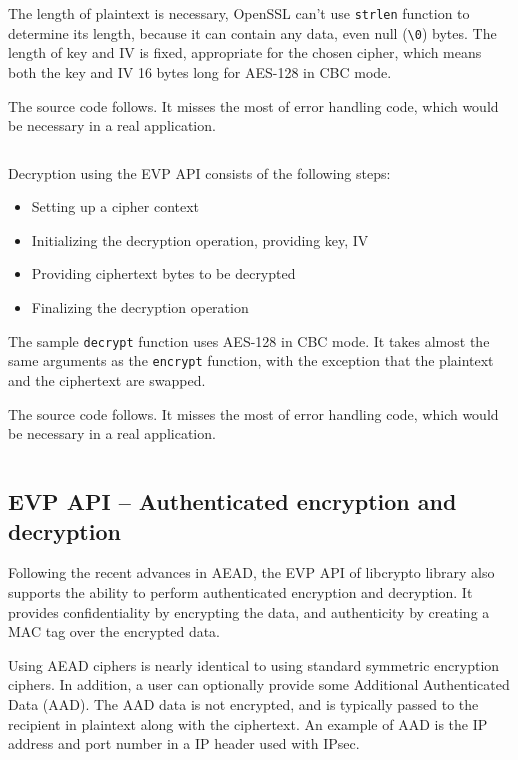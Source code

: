 The length of plaintext is necessary, OpenSSL can't use \texttt{strlen} function to determine its length, because it can contain any data, even null (\texttt{\textbackslash0}) bytes. The length of key and IV is fixed, appropriate for the chosen cipher, which means both the key and IV 16 bytes long for AES-128 in CBC mode.

The source code follows. It misses the most of error handling code, which would be necessary in a real application.

\inputminted{c}{code/openssl-evp-encrypt.c}

Decryption using the EVP API consists of the following steps:

\begin{itemize}
  \item Setting up a cipher context
  \item Initializing the decryption operation, providing key, IV
  \item Providing ciphertext bytes to be decrypted
  \item Finalizing the decryption operation
\end{itemize}

The sample \texttt{decrypt} function uses AES-128 in CBC mode. It takes almost the same arguments as the \texttt{encrypt} function, with the exception that the plaintext and the ciphertext are swapped.

The source code follows. It misses the most of error handling code, which would be necessary in a real application.

\inputminted{c}{code/openssl-evp-decrypt.c}


\subsection{EVP API -- Authenticated encryption and decryption}
\label{toc/openssl-evp-aead-encryption}

Following the recent advances in AEAD, the EVP API of libcrypto library also supports the ability to perform authenticated encryption and decryption. It provides confidentiality by encrypting the data, and authenticity by creating a MAC tag over the encrypted data.

Using AEAD ciphers is nearly identical to using standard symmetric encryption ciphers. In addition, a user can optionally provide some Additional Authenticated Data (AAD). The AAD data is not encrypted, and is typically passed to the recipient in plaintext along with the ciphertext. An example of AAD is the IP address and port number in a IP header used with IPsec.

